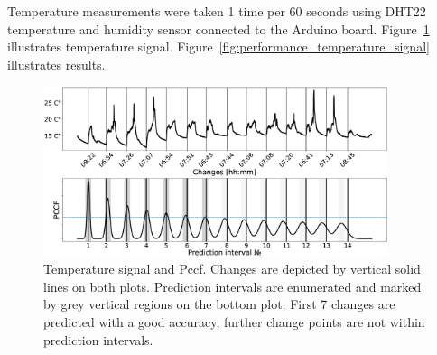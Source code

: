 Temperature measurements were taken 1 time per 60 seconds using DHT22 temperature and humidity sensor connected to the Arduino board.
Figure~\ref{fig:temperature_signal} illustrates temperature signal.
Figure~\ref{fig:performance_temperature_signal} illustrates results.
\begin{figure}[!htb]
	\centering
	\includegraphics[width=0.9\textwidth]{./pics/journal_paper/temperature_signal}
	\caption{
    Temperature signal and Pccf.
    Changes are depicted by vertical solid lines on both plots.
    Prediction intervals are enumerated and marked by grey vertical regions on the bottom plot. First 7 changes are predicted with a good accuracy, further change points are not within prediction intervals.
  }
	\label{fig:temperature_signal}
\end{figure}
